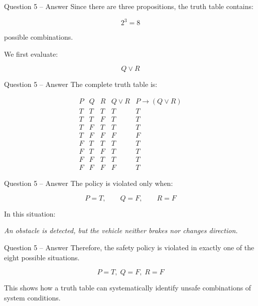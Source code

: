 \begin{frame}{Question 5 -- Answer}
Since there are three propositions, the truth table contains:

$$
2^3=8
$$

possible combinations.

We first evaluate:

$$
Q\lor R
$$

\end{frame}

\begin{frame}{Question 5 -- Answer}
The complete truth table is:

$$
\begin{matrix}
P & Q & R & Q\lor R & P\rightarrow(Q\lor R) \\
T & T & T & T & T \\
T & T & F & T & T \\
T & F & T & T & T \\
T & F & F & F & F \\
F & T & T & T & T \\
F & T & F & T & T \\
F & F & T & T & T \\
F & F & F & F & T
\end{matrix}
$$

\end{frame}

\begin{frame}{Question 5 -- Answer}
The policy is violated only when:

$$
P=T,\qquad Q=F,\qquad R=F
$$

In this situation:

\begin{center}
\textit{An obstacle is detected, but the vehicle neither brakes nor changes
direction.}
\end{center}
\end{frame}

\begin{frame}{Question 5 -- Answer}
Therefore, the safety policy is violated in exactly one of the eight
possible situations.

$$
\boxed{P=T,\;Q=F,\;R=F}
$$

This shows how a truth table can systematically identify unsafe
combinations of system conditions.
\end{frame}
